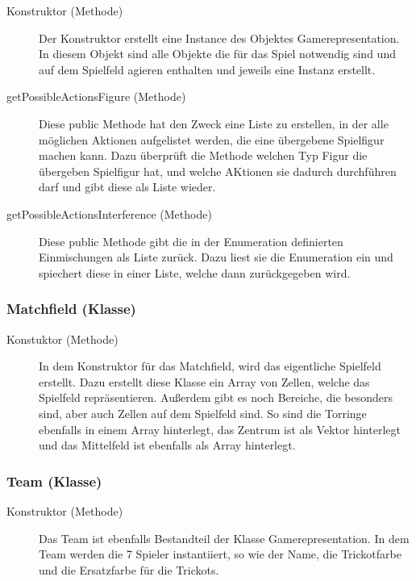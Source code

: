 		\begin{description}
                
			\item[Konstruktor (Methode)]
			Der Konstruktor erstellt eine Instance des Objektes Gamerepresentation. In diesem Objekt sind alle Objekte die für das Spiel notwendig sind und auf dem Spielfeld agieren enthalten und jeweils eine Instanz erstellt.
                
        	\item[getPossibleActionsFigure (Methode)]
        	Diese public Methode hat den Zweck eine Liste zu erstellen, in der alle möglichen Aktionen aufgelistet werden, die eine übergebene Spielfigur machen kann. Dazu überprüft die Methode welchen Typ Figur die übergeben Spielfigur hat, und welche AKtionen sie dadurch durchführen darf und gibt diese als Liste wieder.
        	
        	\item[getPossibleActionsInterference (Methode)]
        	Diese public Methode gibt die in der Enumeration definierten Einmischungen als Liste zurück. Dazu liest sie die Enumeration ein und spiechert diese in einer Liste, welche dann zurückgegeben wird. 
        \end{description}
        	
        \subsubsection{Matchfield (Klasse)}
        \begin{description}
        	\item[Konstuktor (Methode)]
        	In dem Konstruktor für das Matchfield, wird das eigentliche Spielfeld erstellt. Dazu erstellt diese Klasse ein Array von Zellen, welche das Spielfeld repräsentieren. Außerdem gibt es noch Bereiche, die besonders sind, aber auch Zellen auf dem Spielfeld sind. So sind die Torringe ebenfalls in einem Array hinterlegt, das Zentrum ist als Vektor hinterlegt und das Mittelfeld ist ebenfalls als Array hinterlegt.
        \end{description}
        
        \subsubsection{Team (Klasse)}
        \begin{description}
        	\item[Konstruktor (Methode)]
        	Das Team ist ebenfalls Bestandteil der Klasse Gamerepresentation. In dem Team werden die 7 Spieler instantiiert, so wie der Name, die Trickotfarbe und die Ersatzfarbe für die Trickots.
        \end{description}
        
